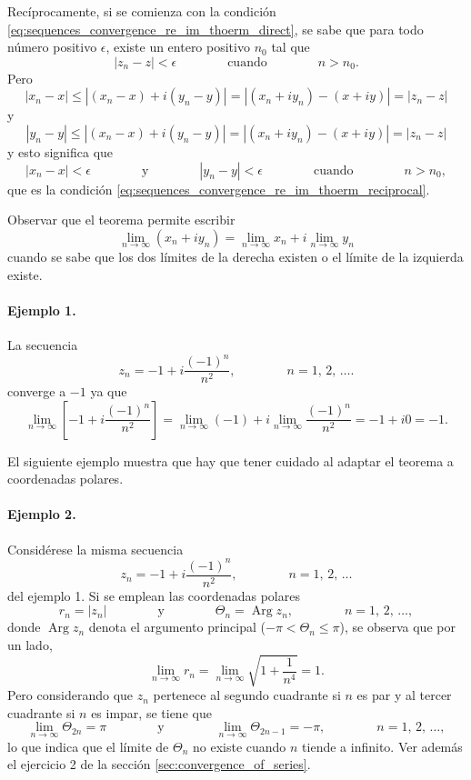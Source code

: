 \documentclass[a4paper]{report}
\DeclareMathOperator{\Arg}{Arg}
\begin{document}
Recíprocamente, si se comienza con la condición \ref{eq:sequences_convergence_re_im_thoerm_direct}, se sabe que para todo número positivo \(\epsilon\), existe un entero positivo \(n_0\) tal que 
\[
 |z_n-z|<\epsilon
 \qquad\qquad\textrm{cuando}\qquad\qquad
 n>n_0.
\]
Pero
\[
|x_n-x|\leq|(x_n-x)+i(y_n-y)|=|(x_n+iy_n)-(x+iy)|=|z_n-z| 
\]
y
\[
|y_n-y|\leq|(x_n-x)+i(y_n-y)|=|(x_n+iy_n)-(x+iy)|=|z_n-z|
\]
y esto significa que 
\[
 |x_n-x|<\epsilon
 \qquad\qquad\textrm{y}\qquad\qquad
 |y_n-y|<\epsilon
 \qquad\qquad\textrm{cuando}\qquad\qquad
 n>n_0,
\]
que es la condición \ref{eq:sequences_convergence_re_im_thoerm_reciprocal}.

Observar que el teorema permite escribir 
\[
 \lim_{n\to\infty}(x_n+iy_n)=\lim_{n\to\infty}x_n+i\lim_{n\to\infty}y_n
\]
cuando se sabe que los dos límites de la derecha existen o el límite de la izquierda existe.

\paragraph{Ejemplo 1.} La secuencia
\[
 z_n=-1+i\frac{(-1)^n}{n^2},
 \qquad\qquad
 n=1,\,2,\,\dots.
\]
converge a \(-1\) ya que 
\[
 \lim_{n\to\infty}\left[-1+i\frac{(-1)^n}{n^2}\right]=\lim_{n\to\infty}(-1)+i\lim_{n\to\infty}\frac{(-1)^n}{n^2}=-1+i0=-1.
\]

El siguiente ejemplo muestra que hay que tener cuidado al adaptar el teorema a coordenadas polares.

\paragraph{Ejemplo 2.} Considérese la misma secuencia
\[
 z_n=-1+i\frac{(-1)^n}{n^2},
 \qquad\qquad
 n=1,\,2,\,\dots
\]
del ejemplo 1. Si se emplean las coordenadas polares
\[
 r_n=|z_n|
 \qquad\qquad\textrm{y}\qquad\qquad
 \Theta_n=\Arg z_n,
 \qquad\qquad
 n=1,\,2,\,\dots,
\]
donde \(\Arg z_n\) denota el argumento principal (\(-\pi<\Theta_n\leq\pi\)), se observa que por un lado,
\[
 \lim_{n\to\infty}r_n=\lim_{n\to\infty}\sqrt{1+\frac{1}{n^4}}=1.
\]
Pero considerando que \(z_n\) pertenece al segundo cuadrante si \(n\) es par y al tercer cuadrante si \(n\) es impar, se tiene que 
\[
 \lim_{n\to\infty}\Theta_{2n}=\pi
 \qquad\qquad\textrm{y}\qquad\qquad
 \lim_{n\to\infty}\Theta_{2n-1}=-\pi,
 \qquad\qquad
 n=1,\,2,\,\dots,
\]
lo que indica que el límite de \(\Theta_n\) no existe cuando \(n\) tiende a infinito. Ver además el ejercicio 2 de la sección \ref{sec:convergence_of_series}.
\end{document}
